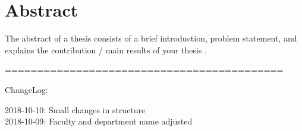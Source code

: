 \section*{Abstract}
The abstract of a thesis consists of 
a brief  introduction,  problem statement, and  explains the contribution / main results of your thesis .

===========================================

ChangeLog:

2018-10-10: Small changes in structure\\
2018-10-09: Faculty and department name adjusted 

